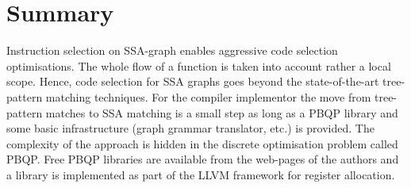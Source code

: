 \section{Summary}

Instruction selection on SSA-graph enables aggressive code
selection optimisations. The whole flow of a function is taken
into account rather a local scope. Hence, code selection
for SSA graphs goes beyond the state-of-the-art tree-pattern
matching techniques. 
For the compiler implementor the move from tree-pattern
matches to SSA matching is a small step as long as a
PBQP library and some basic infrastructure (graph grammar
translator, etc.) is provided. The complexity of the
approach is hidden in the discrete optimisation problem called
PBQP. Free PBQP libraries are available 
from the web-pages of the authors and a library is implemented
as part of the LLVM framework for register allocation. 

